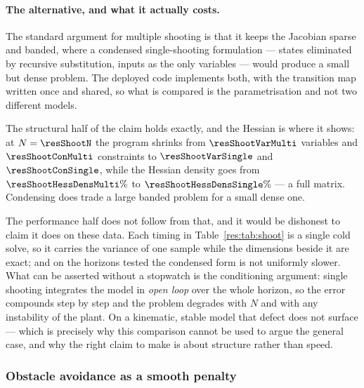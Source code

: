 \documentclass[11pt,a4paper]{article}
\begin{document}
\paragraph{The alternative, and what it actually costs.} The standard argument for multiple shooting is that
it keeps the Jacobian sparse and banded, where a condensed single-shooting formulation --- states eliminated
by recursive substitution, inputs as the only variables --- would produce a small but dense problem. The
deployed code implements both, with the transition map written once and shared, so what is compared is the
parametrisation and not two different models.

\begin{table}[htbp]
  \centering
  \small
  \caption{Multiple (M) against single (S) shooting on the same instance. Dimensions, densities and iteration counts are exact; each timing is the fastest of three cold solves, with no warm start.}
  \label{res:tab:shoot}
\end{table}

The structural half of the claim holds exactly, and the Hessian is where it shows: at $N=\resShootN$ the
program shrinks from $\resShootVarMulti$ variables and $\resShootConMulti$ constraints to
$\resShootVarSingle$ and $\resShootConSingle$, while the Hessian density goes from
$\resShootHessDensMulti\%$ to $\resShootHessDensSingle\%$ --- a full matrix. Condensing does trade a large
banded problem for a small dense one.

The performance half does not follow from that, and it would be dishonest to claim it does on these data.
Each timing in Table~\ref{res:tab:shoot} is a single cold solve, so it carries the variance of one sample
while the dimensions beside it are exact; and on the horizons tested the condensed form is not uniformly
slower. What can be asserted without a stopwatch is the conditioning argument: single shooting integrates the
model in \emph{open loop} over the whole horizon, so the error compounds step by step and the problem
degrades with $N$ and with any instability of the plant. On a kinematic, stable model that defect does not
surface --- which is precisely why this comparison cannot be used to argue the general case, and why the
right claim to make is about structure rather than speed.

\subsubsection{Obstacle avoidance as a smooth penalty}
\label{sec:barrier}
\end{document}
